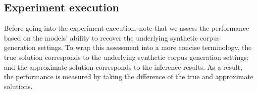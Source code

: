 \documentclass{mpaper}
\begin{document}
\subsection{Experiment execution}


\par Before going into the experiment execution, note that we assess the performance based on the models' ability to recover the underlying synthetic corpus generation settings. To wrap this assessment into a more concise terminology, the true solution corresponds to the underlying synthetic corpus generation settings; and the approximate solution corresponds to the inference results. As a result, the performance is measured by taking the difference of the true and approximate solutions. 
\end{document}
